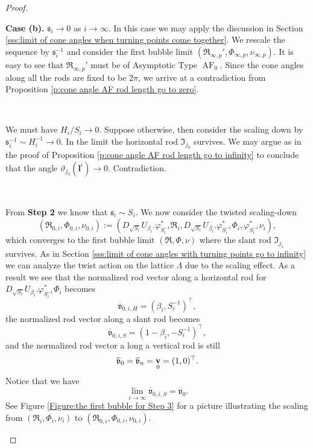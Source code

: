 \documentclass[a4paper,11pt]{amsart}
\theoremstyle{definition}
\numberwithin{equation}{section}
\newcommand{\bl}{\bm{l}}
\newcommand{\mv} {\mathfrak v}
\newcommand{\ms} {\mathfrak s}
\newcommand{\mI} {\mathfrak I}
\newcommand{\mR} {\mathfrak R}
\DeclareMathOperator{\bv}{{\bf v}}
\DeclareMathOperator{\AF}{AF}
\begin{document}
\begin{proof}
\

{\bf Case (b).} $\ms_i\rightarrow 0$ as $i\rightarrow\infty$. In this case we may apply the discussion in Section \ref{sss:limit of cone angles when turning points come together}. We rescale the sequence by $\ms_i^{-1}$ and consider the first bubble limit $(\mR_{\infty, p}', \Phi_{\infty, p}, \nu_{\infty, p})$. It is easy to see that $\mR_{\infty, p}'$ must be of Asymptotic Type $\AF_0$. Since the cone angles along all the rods are fixed to be $2\pi$, we arrive at a contradiction from Proposition \ref{p:cone angle AF rod length go to zero}.

\

 We must have $H_i/S_i\rightarrow 0$. Suppose otherwise, then consider the scaling down by $\ms_i^{-1}\sim H_i^{-1}\to0$. In the limit the horizontal rod $\mI_{j_0}$ survives. We may argue as in the proof of Proposition \ref{p:cone angle AF rod length go to infinity} to conclude that the angle $\vartheta_{j_0}(\bl^i)\rightarrow 0$. Contradiction. 

\

 From \textbf{Step 2} we know that $\ms_i\sim S_i$. We now consider the twisted scaling-down 
\begin{equation}\label{eq:first twist scale down}
    (\mR_{0,i},\Phi_{0,i},\nu_{0,i}):=(D_{\sqrt{S_i}}U_{\beta_i}.\varphi_{S_i^{-1}}^*\mR_i,D_{\sqrt{S_i}}U_{\beta_i}.\varphi_{S_i^{-1}}^*\Phi_i,\varphi_{S_i^{-1}}^*\nu_i),
\end{equation} 
which converges to the first bubble limit $(\mR, \Phi, \nu)$ where the slant rod $\mI_{j_1}$  survives.  As in Section \ref{sss:limit of cone angles with turning points go to infinity} we can analyze the twist action on the lattice $\Lambda$ due to the scaling effect. As a result we see that the normalized rod vector along a horizontal rod for $D_{\sqrt{S_i}}U_{\beta_i}.\varphi_{S_i^{-1}}^*\Phi_i$ becomes 
$$\overline{\mv}_{0,i, H}=(\beta_i, S_i^{-1})^\top,$$
 the normalized rod vector along a slant rod becomes 
$$\overline{\mv}_{0,i,S}=(1-\beta_i, -S_i^{-1})^\top,$$
and the normalized rod vector a long a vertical rod is still 
$$\overline{\mv}_{0}=\overline{\mv}_n=\bv_0=(1,0)^\top.$$ 
Notice that we have 
$$\lim_{i\rightarrow\infty} \overline{\mv}_{0,i, S}=\overline{\mv}_0.$$
See Figure \ref{Figure:the first bubble for Step 3} for a picture illustrating the scaling from $(\mR_i,\Phi_i,\nu_i)$ to $(\mR_{0,i},\Phi_{0,i},\nu_{0,i})$.
\begin{figure}[ht]
\end{figure}
\end{proof}
\end{document}
